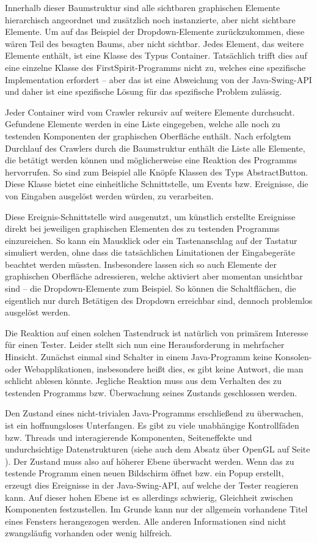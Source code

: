 Innerhalb dieser Baumstruktur sind alle sichtbaren graphischen Elemente
hierarchisch angeordnet und zusätzlich noch instanzierte, aber nicht sichtbare
Elemente. Um auf das Beispiel der Dropdown-Elemente zurückzukommen, diese
wären Teil des besagten Baums, aber nicht sichtbar. Jedes Element, das weitere Elemente enthält,
ist eine Klasse des Typus \glqq{}Container\grqq{}. Tatsächlich trifft dies auf eine
einzelne Klasse des FirstSpirit-Programms nicht zu, welches eine spezifische
Implementation erfordert -- aber das ist eine Abweichung von der Java-Swing-API
und daher ist eine spezifische Lösung für das spezifische Problem zulässig.

Jeder Container wird vom Crawler rekursiv auf weitere Elemente durchsucht.
Gefundene Elemente werden in eine Liste eingegeben, welche alle noch zu
testenden Komponenten der graphischen Oberfläche enthält. Nach erfolgtem
Durchlauf des Crawlers durch die Baumstruktur enthält die Liste
alle Elemente, die betätigt werden können und möglicherweise eine Reaktion
des Programms hervorrufen. So sind zum Beispiel alle Knöpfe Klassen des
Typs \glqq{}AbstractButton\grqq{}. Diese Klasse bietet eine einheitliche Schnittstelle,
um Events bzw. Ereignisse, die von Eingaben ausgelöst werden würden,
zu verarbeiten. 

Diese Ereignis-Schnittstelle wird ausgenutzt, um künstlich erstellte
Ereignisse direkt bei jeweiligen graphischen Elementen des zu testenden 
Programms einzureichen. So kann ein Mausklick oder ein Tastenanschlag 
auf der Tastatur simuliert werden, ohne dass die tatsächlichen Limitationen
der Eingabegeräte beachtet werden müssten. Insbesondere lassen sich so
auch Elemente der graphischen Oberfläche adressieren, welche aktiviert
aber momentan unsichtbar sind -- die Dropdown-Elemente zum Beispiel.
So können die Schaltflächen, die eigentlich nur durch Betätigen des
Dropdown erreichbar sind, dennoch problemlos ausgelöst werden.

Die Reaktion auf einen solchen Tastendruck ist natürlich von primärem
Interesse für einen Tester. Leider stellt sich nun eine Herausforderung
in mehrfacher Hinsicht. Zunächst einmal sind Schalter in einem 
Java-Programm keine Konsolen- oder Webapplikationen, insbesondere
heißt dies, es gibt keine Antwort, die man schlicht ablesen könnte.
Jegliche Reaktion muss aus dem Verhalten des zu testenden Programms
bzw. Überwachung seines Zustands geschlossen werden.

Den Zustand eines nicht-trivialen Java-Programms erschließend
zu überwachen, ist ein hoffnungsloses Unterfangen. Es gibt zu
viele unabhängige Kontrollfäden bzw. Threads und interagierende
Komponenten, Seiteneffekte und undurchsichtige Datenstrukturen
(siehe auch dem Absatz über OpenGL auf Seite \pageref{openglQQ}).
Der Zustand muss also auf höherer Ebene überwacht werden.
Wenn das zu testende Programm einen neuen Bildschirm öffnet
bzw. ein Popup erstellt, erzeugt dies Ereignisse in der Java-Swing-API,
auf welche der Tester reagieren kann. Auf dieser hohen Ebene ist
es allerdings schwierig, Gleichheit zwischen Komponenten
festzustellen. Im Grunde kann nur der allgemein vorhandene Titel
eines Fensters herangezogen werden. Alle anderen Informationen
sind nicht zwangsläufig vorhanden oder wenig hilfreich.

